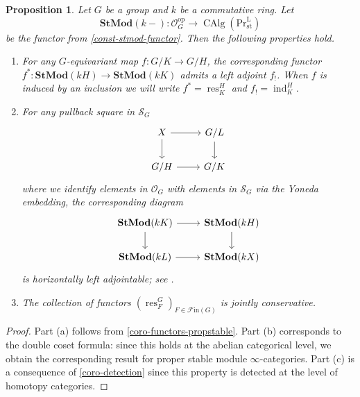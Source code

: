\documentclass{amsart}
\newcommand{\nameop}{\operatorname{op}\nolimits}
\newcommand{\res}{\operatorname{res}\nolimits}
\newcommand{\ind}{\operatorname{ind}\nolimits}
\def \C{{\mathcal C}}
\def \O{{\mathcal O}}
\def \S{{\mathcal S}}
\def \Fin{{\mathcal{F}\textrm{in}}}
\def \PrL{\mathrm{Pr}^{\mathrm{L}}_{\mathrm{st}}}
\DeclareMathOperator{\CAlg}{CAlg}
\numberwithin{equation}{section}%
\newtheorem{proposition}[equation]{Proposition}
\theoremstyle{remark}
\newtheorem{convention}[equation]{Convention}
\begin{document}
{%



\begin{proposition}
      Let $G$ be a group and $k$ be a commutative ring. Let 
      \[
      \mathbf{StMod}(k-)\colon \O_G^{\nameop} \to \CAlg(\PrL) 
      \]
      be the functor from \cref{const-stmod-functor}. Then the following properties hold.
    \begin{enumerate}
        \item For any $G$-equivariant map $f \colon G/K \to G/H$, the corresponding functor $f^* \colon \mathbf{StMod}(kH) \to \mathbf{StMod}(kK)$ admits a left adjoint $f_!$. When $f$ is induced by an inclusion we will write $f^*=\res^H_K$ and $f_!=\ind_K^H$.
        \item For any pullback square in $\S_{G}$
    \[
    \begin{tikzcd}
        X \arrow[r] \arrow[d] & G/L\arrow[d] \\
        G/H \arrow[r] & G/K
    \end{tikzcd}
    \]
  where we identify elements in $\O_G$ with elements in $\S_G$ via the Yoneda embedding, the corresponding diagram 
    \[
    \begin{tikzcd}
        \mathbf{StMod}(kK)\arrow[r] \arrow[d] & \mathbf{StMod}(kH)\arrow[d] \\
        \mathbf{StMod}(kL) \arrow[r] & \mathbf{StMod}(kX)
    \end{tikzcd}
    \]
    is horizontally left adjointable; see \cite[Definition 4.7.4.13]{Lur17}. 
    \item The collection of functors $(\res^G_F)_{F \in  \Fin(G)}$ is jointly conservative. 
    \end{enumerate}
\end{proposition}

\begin{proof}
    Part (a) follows from \cref{coro-functors-propstable}. Part (b) corresponds to the double coset formula: since this holds at the abelian categorical level, we obtain the corresponding result for proper stable module $\infty$-categories. Part (c) is a consequence of \cref{coro-detection} since this property is detected at the level of homotopy categories. 
\end{proof}

}
\end{document}
